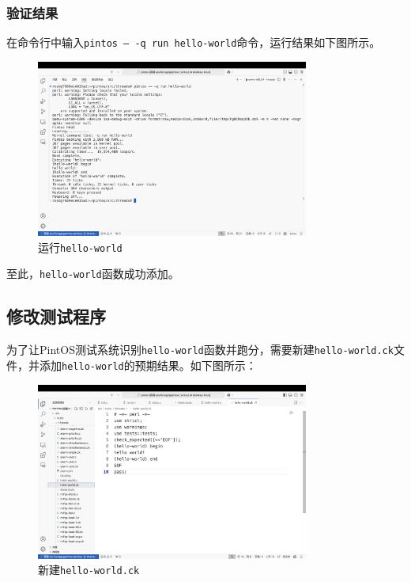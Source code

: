 \documentclass{article}
\begin{document}
\subsubsection{验证结果}

在命令行中输入\texttt{pintos -- -q run hello-world}命令，运行结果如下图所示。

\begin{figure}[H]
	\centering
	\includegraphics[width=0.8\textwidth]{img/run_helloworld.png}
	\caption{运行\texttt{hello-world}}
\end{figure}

至此，\texttt{hello-world}函数成功添加。

\subsection{修改测试程序}

为了让PintOS测试系统识别\texttt{hello-world}函数并跑分，需要新建\texttt{hello-world.ck}文件，并添加\texttt{hello-world}的预期结果。如下图所示：

\begin{figure}[H]
	\centering
	\includegraphics[width=0.8\textwidth]{img/helloworldck.png}
	\caption{新建\texttt{hello-world.ck}}
\end{figure}
\end{document}
